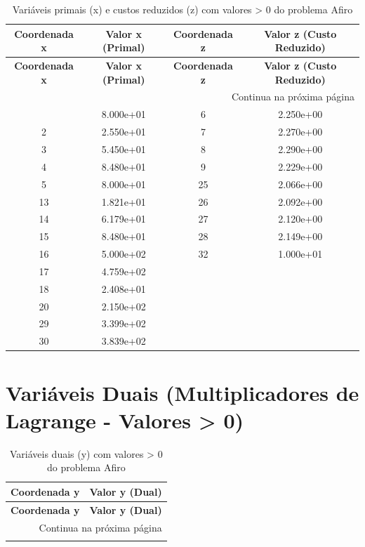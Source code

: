 \documentclass[12pt]{article}
\begin{document}
\begin{longtable}{@{}cccc@{}}
\caption{Variáveis primais (x) e custos reduzidos (z) com valores > 0 do problema Afiro} \\
\toprule
\textbf{Coordenada x} & \textbf{Valor x (Primal)} & \textbf{Coordenada z} & \textbf{Valor z (Custo Reduzido)} \\
\midrule
\endfirsthead

\toprule
\textbf{Coordenada x} & \textbf{Valor x (Primal)} & \textbf{Coordenada z} & \textbf{Valor z (Custo Reduzido)} \\
\midrule
\endhead

\midrule \multicolumn{4}{r}{{Continua na próxima página}} \\ \midrule
\endfoot

\bottomrule
\endlastfoot
1 & 8.000e+01 & 6 & 2.250e+00 \\
2 & 2.550e+01 & 7 & 2.270e+00 \\
3 & 5.450e+01 & 8 & 2.290e+00 \\
4 & 8.480e+01 & 9 & 2.229e+00 \\
5 & 8.000e+01 & 25 & 2.066e+00 \\
13 & 1.821e+01 & 26 & 2.092e+00 \\
14 & 6.179e+01 & 27 & 2.120e+00 \\
15 & 8.480e+01 & 28 & 2.149e+00 \\
16 & 5.000e+02 & 32 & 1.000e+01 \\
17 & 4.759e+02 &  &  \\
18 & 2.408e+01 &  &  \\
20 & 2.150e+02 &  &  \\
29 & 3.399e+02 &  &  \\
30 & 3.839e+02 &  &  \\

\bottomrule
\end{longtable}


\section{Variáveis Duais (Multiplicadores de Lagrange - Valores > 0)}

\begin{longtable}{@{}cc@{}}
\caption{Variáveis duais (y) com valores > 0 do problema Afiro} \\
\toprule
\textbf{Coordenada y} & \textbf{Valor y (Dual)} \\
\midrule
\endfirsthead

\toprule
\textbf{Coordenada y} & \textbf{Valor y (Dual)} \\
\midrule
\endhead

\midrule \multicolumn{2}{r}{{Continua na próxima página}} \\ \midrule
\endfoot

\bottomrule
\endlastfoot

\bottomrule
\end{longtable}
\end{document}
